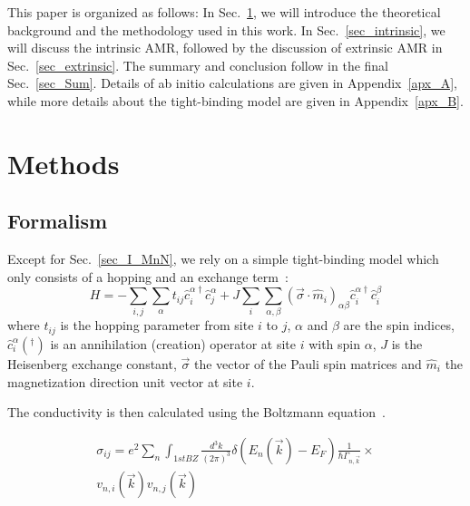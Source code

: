 \documentclass[prb,showpacs,amsmath,amssymb,superscriptaddress,twocolumn,floatfix]{revtex4-1}
\begin{document}
This paper is organized as follows: In Sec.~\ref{sec_modelling}, we
will introduce the theoretical background and the methodology used in this work. In Sec.~\ref{sec_intrinsic}, we will discuss the intrinsic AMR, followed by the discussion of extrinsic AMR in Sec.~\ref{sec_extrinsic}. The summary and conclusion follow in the final Sec.~\ref{sec_Sum}. Details of ab initio calculations are given in Appendix~\ref{apx_A}, while more details about the tight-binding model are given in Appendix~\ref{apx_B}.

\section{Methods}
\label{sec_modelling}

\subsection{Formalism}

{\color{blue} Except for Sec.~\ref{sec_I_MnN}, we rely on a simple} tight-binding model which only consists of a hopping and an exchange term~\cite{Gonzalez-Hernandez:2024}:
\begin{equation}
	H = -\sum_{i, j}\sum_\alpha t_{ij} {\hat{c}_i^{\alpha\dagger}} \hat{c}^\alpha_j + J \sum_{i} \sum_{\alpha, \beta} (\vec{\sigma} \cdot \hat{m}_i)_{\alpha \beta} {\hat{c}_i^{\alpha\dagger}} \hat{c}^\beta_i 
	\label{eq_sdmodel}
\end{equation} 
where $t_{ij}$ is the hopping parameter from site $i$ to $j$, $\alpha$ and $\beta$ are the spin indices, ${\hat{c}_i^{\alpha}}(^\dagger)$ is an annihilation (creation) operator at site $i$ with spin $\alpha$, $J$ is the Heisenberg exchange constant, $\vec{\sigma}$ the vector of the Pauli spin matrices and $\hat{m}_i$ the magnetization direction unit vector at site $i$.

The conductivity is then calculated using the Boltzmann equation~\cite{Vyborny:2009}. 

\begin{multline}
	\sigma_{ij} = e^2 \sum_n  \int_ {1st BZ} \frac{d^3k}{(2\pi)^3} \delta(E_n(\vec{k}) - E_F) \frac{1}{\hbar \Gamma_{n, \vec{k}}} \times \\ v_{n,i}(\vec{k}) v_{n,j}(\vec{k})
	\label{eq_Boltzmann_1}
\end{multline}
\end{document}
